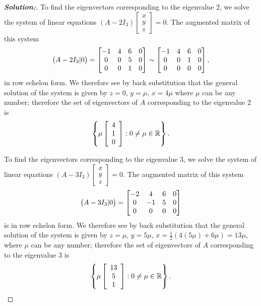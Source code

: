 \documentclass[a4paper]{amsart}
\theoremstyle{definition}
\newenvironment{solution}{\begin{proof}[\textbf{Solution:}] \vphantom{u}}{\end{proof}}
\begin{document}
\begin{solution}
 To find the eigenvectors corresponding to the eigenvalue $2$, we
 solve the system of linear equations $(A - 2I_3)\left[
 \begin{array}{c}x \\ y\\z
 \end{array} \right] = 0$. The augmented matrix of this system
 $$
 \big(A - 2I_3|0\big) = \left[\begin{matrix} -1& 4&
 6&0\\0&0&5&0\\0&0&1&0\end{matrix}\right] \sim \left[\begin{matrix} -1& 4&
 6&0\\0&0&1&0\\0&0&0&0\end{matrix}\right],
 $$
 in row echelon form. We therefore see by back substitution that
 the general solution of the system is given by $z = 0$, $y = \mu$,
 $x = 4\mu$ where $\mu$ can be any number; therefore the set of
 eigenvectors of $A$ corresponding to the eigenvalue $2$ is
 $$
 \left\{ \mu \left[ \begin{array}{c} 4\\1\\0
 \end{array} \right] : 0 \neq \mu \in {\mathbb{R}} \right\}.
 $$

 To find the eigenvectors corresponding to the eigenvalue $3$, we
 solve the system of linear equations $(A - 3I_3)\left[
 \begin{array}{c}x \\ y\\z
 \end{array} \right] = 0$. The augmented matrix of this system
 $$
 \big(A - 3I_3|0\big) = \left[\begin{matrix} -2& 4&
 6&0\\0&-1&5&0\\0&0&0&0\end{matrix}\right]
 $$
 is in row echelon form. We therefore see by back substitution that
 the general solution of the system is given by $z = \mu$, $y =
 5\mu$, $x = \frac{1}{2}(4(5\mu) + 6\mu) = 13\mu$,  where $\mu$ can
 be any number; therefore the set of eigenvectors of $A$
 corresponding to the eigenvalue $3$ is
 $$
 \left\{ \mu \left[ \begin{array}{c} 13\\5\\1
 \end{array} \right] : 0 \neq \mu \in {\mathbb{R}} \right\}.
 $$
\end{solution}
\end{document}

